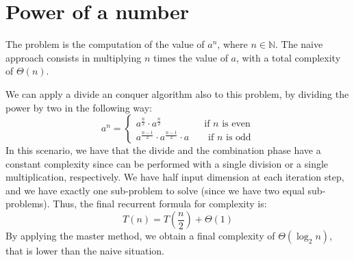 \section{Power of a number}

The problem is the computation of the value of $a^n$, where $n\in\mathbb{N}$. 
The naive approach consists in multiplying $n$ times the value of $a$, with a total complexity of $\Theta(n)$. 

We can apply a divide an conquer algorithm also to this problem, by dividing the power by two in the following way: 
\[a^n=\begin{cases}
    a^\frac{n}{2}\cdot a^\frac{n}{2}  \:\:\qquad\qquad \text{if }n\text{ is even} \\
    a^\frac{n-1}{2}\cdot a^\frac{n-1}{2} \cdot a \qquad \text{if }n\text{ is odd}
\end{cases}\]
In this scenario, we have that the divide and the combination phase have a constant complexity since can be performed with a single division or a single multiplication, respectively. 
We have half input dimension at each iteration step, and we have exactly one sub-problem to solve (since we have two equal sub-problems). 
Thus, the final recurrent formula for complexity is: 
\[T(n)=T\left(\dfrac{n}{2}\right)+\Theta(1)\]
By applying the master method, we obtain a final complexity of $\Theta(\log_2n)$, that is lower than the naive situation. 